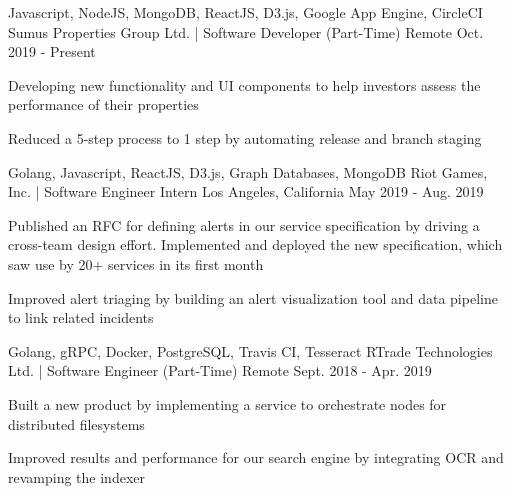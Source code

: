 

\begin{cventries}

  \cventry
    {Javascript, NodeJS, MongoDB, ReactJS, D3.js, Google App Engine, CircleCI} %
    {Sumus Properties Group Ltd. | Software Developer (Part-Time)} %
    {Remote} %
    {Oct. 2019 - Present} %
    {
      \begin{cvitems} %
        \item {Developing new functionality and UI components to help investors assess the performance of their properties}
        \item {Reduced a 5-step process to 1 step by automating release and branch staging}
      \end{cvitems}
    }

  \cventry
    {Golang, Javascript, ReactJS, D3.js, Graph Databases, MongoDB} %
    {Riot Games, Inc. | Software Engineer Intern} %
    {Los Angeles, California} %
    {May 2019 - Aug. 2019} %
    {
      \begin{cvitems} %
        \item {Published an RFC for defining alerts in our service specification by driving a cross-team design effort. Implemented and deployed the new specification, which saw use by 20+ services in its first month}
        \item {Improved alert triaging by building an alert visualization tool and data pipeline to link related incidents}
      \end{cvitems}
    }

  \cventry
    {Golang, gRPC, Docker, PostgreSQL, Travis CI, Tesseract} %
    {RTrade Technologies Ltd. | Software Engineer (Part-Time)} %
    {Remote} %
    {Sept. 2018 - Apr. 2019} %
    {
      \begin{cvitems} %
        \item {Built a new product by implementing a service to orchestrate nodes for distributed filesystems}
        \item {Improved results and performance for our search engine by integrating OCR and revamping the indexer}
      \end{cvitems}
    }


\end{cventries}
